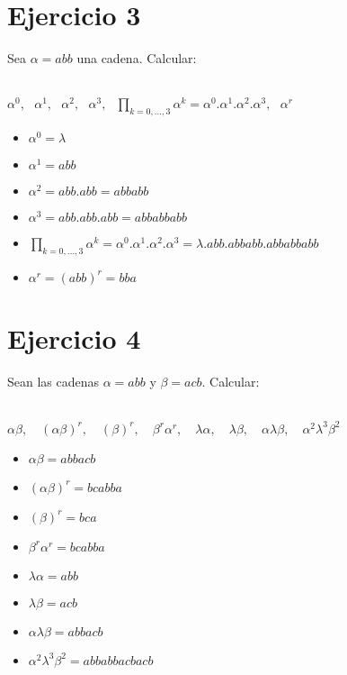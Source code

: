 \documentclass[12pt]{article}
\begin{document}
\section*{Ejercicio 3}
Sea \textit{$\alpha = abb$} una cadena. Calcular:
\\
\\
\centerline{$\alpha^0,\ \ \ \alpha^1,\ \ \ \alpha^2,\ \ \ \alpha^3,\ \ \ \prod_{k=0,...,3}{\alpha^k = \alpha^0.\alpha^1.\alpha^2.\alpha^3},\ \ \ \alpha^r$}

\begin{itemize}
    \item $\alpha^0 = \lambda$
    \item $\alpha^1 = \textit{abb}$
    \item $\alpha^2 = \textit{abb}{.}\textit{abb} = \textit{abbabb}$
    \item $\alpha^3 = \textit{abb}{.}\textit{abb}{.}\textit{abb} = \textit{abbabbabb}$
    \item $\prod_{k=0,...,3}{\alpha^k = \alpha^0.\alpha^1.\alpha^2.\alpha^3} = \lambda.\textit{abb}{.}\textit{abbabb}{.}\textit{abbabbabb}$
    \item $\alpha^r = (\textit{abb})^r = \textit{bba}$
\end{itemize}

\section*{Ejercicio 4}
Sean las cadenas \textit{$\alpha = abb$} y \textit{$\beta = acb$}. Calcular:
\\
\\
\centerline{\(\alpha\beta, \quad (\alpha\beta)^r, \quad (\beta)^r, \quad \beta^r\alpha^r, \quad \lambda\alpha , \quad \lambda\beta, \quad \alpha\lambda\beta, \quad \alpha^2\lambda^3\beta^2\)}

\begin{itemize}
    \item $\alpha\beta = abbacb$
    \item $(\alpha\beta)^r = bcabba$
    \item $(\beta)^r = bca$
    \item $\beta^r\alpha^r = bcabba$
    \item $\lambda\alpha = abb$
    \item $\lambda\beta = acb$
    \item $\alpha\lambda\beta = abbacb$
    \item $\alpha^2\lambda^3\beta^2 = abbabbacbacb$
\end{itemize}
\end{document}
